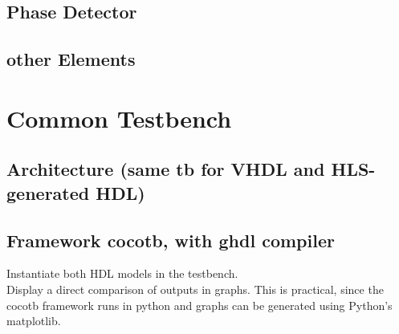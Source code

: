   \subsection{Phase Detector}
  \subsection{other Elements}

\section{Common Testbench}
  \subsection{Architecture (same tb for VHDL and HLS-generated HDL)}
  \subsection{Framework cocotb, with ghdl compiler}
  Instantiate both HDL models in the testbench.\\
  Display a direct comparison of outputs in graphs. This is practical, since the cocotb framework runs in python and graphs can be generated using Python's matplotlib.

